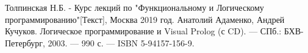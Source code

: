 \newpage
{}

\begin{thebibliography}{}
      Толпинская Н.Б.  -  Курс лекций по "Функциональному и Логическому программированию"[Текст], Москва 2019 год.
      Анатолий Адаменко, Андрей Кучуков. Логическое программирование и Visual Prolog (с CD). — СПб.: БХВ-Петербург, 2003. — 990 с. — ISBN 5-94157-156-9.
\end{thebibliography}
